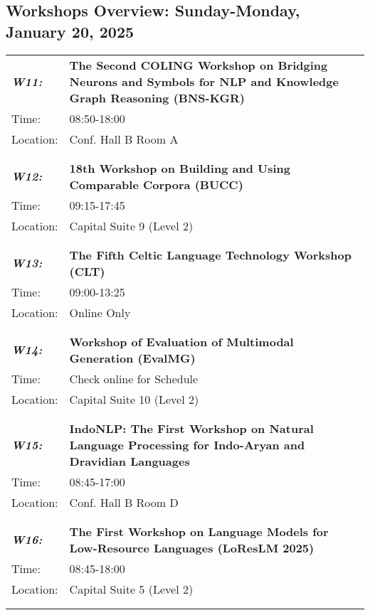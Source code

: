 \subsection{Workshops Overview: Sunday-Monday, January 20, 2025}
\begin{longtable}{p{15mm}p{100mm}}
\emph{\textbf{W11:}} & \textbf{The Second COLING Workshop on Bridging Neurons and Symbols for NLP and Knowledge Graph Reasoning (BNS-KGR)} \\
Time: & 08:50-18:00 \\
Location: & Conf. Hall B Room A \\\\
\hline\\
\emph{\textbf{W12:}} & \textbf{18th Workshop on Building and Using Comparable Corpora (BUCC)} \\
Time: & 09:15-17:45 \\
Location: & Capital Suite 9 (Level 2) \\\\
\hline\\
\emph{\textbf{W13:}} & \textbf{The Fifth Celtic Language Technology Workshop (CLT)} \\
Time: & 09:00-13:25 \\
Location: & Online Only \\\\
\hline\\
\emph{\textbf{W14:}} & \textbf{Workshop of Evaluation of Multimodal Generation (EvalMG)} \\
Time: & Check online for Schedule \\
Location: & Capital Suite 10 (Level 2) \\\\
\hline\\
\emph{\textbf{W15:}} & \textbf{IndoNLP: The First Workshop on Natural Language Processing for Indo-Aryan and Dravidian Languages} \\
Time: & 08:45-17:00 \\
Location: & Conf. Hall B Room D \\\\
\hline\\
\emph{\textbf{W16:}} & \textbf{The First Workshop on Language Models for Low-Resource Languages (LoResLM 2025)} \\
Time: & 08:45-18:00 \\
Location: & Capital Suite 5 (Level 2) \\\\
\hline\\

\end{longtable}
